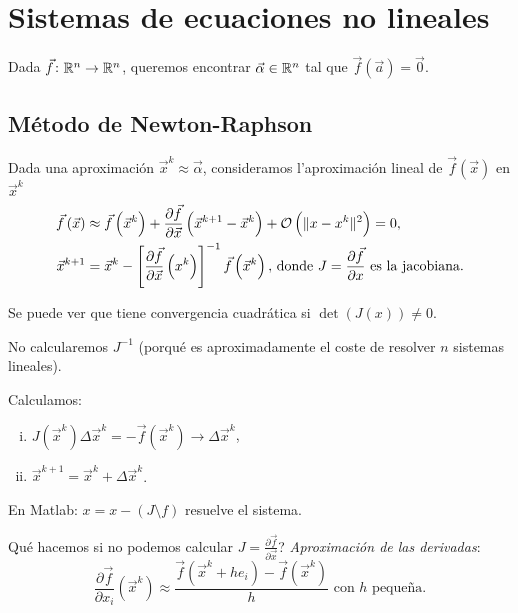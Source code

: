 \chapter{Sistemas de ecuaciones no lineales}

Dada $\vec{f} \colon \mathbb{R}^n \to \mathbb{R}^n$, queremos encontrar $\vec{\alpha} \in \mathbb{R}^n$ tal que $\vec{f}\left( \vec{a} \right) = \vec{0}$.

\section{M\'etodo de Newton-Raphson}

Dada una aproximaci\'on $\vec{x}^k \approx \vec{\alpha}$, consideramos l'aproximaci\'on lineal de $\vec{f}\left( \vec{x} \right)$ en $\vec{x}^k$
\begin{align*}
    \vec{f}\left( \vec{x} \right) &\approx \vec{f}\left( \vec{x}^k \right) + \frac{\partial \vec{f}}{\partial \vec{x}}\left( \vec{x}^{k+1}-\vec{x}^k \right) + \mathcal{O} \left( \|x-x^k\|^2 \right) = 0, \\
    \vec{x}^{k+1} &= \vec{x}^k - \left[ \frac{\partial\vec{f}}{\partial\vec{x}}\left( x^k \right) \right]^{-1} \vec{f}\left( \vec{x}^k \right),\, \text{donde } J = \frac{\partial\vec{f}}{\partial x} \text{ es la jacobiana.}
\end{align*}

Se puede ver que tiene convergencia cuadr\'atica si $\det\left( J(x) \right) \neq 0$.

\begin{obs}
    No calcularemos $J^{-1}$ (porqu\'e es aproximadamente el coste de resolver $n$ sistemas lineales).
\end{obs}

\noindent Calculamos:
\begin{enumerate}[i)]
    \item $J\left( \vec{x}^k \right)\Delta \vec{x}^k = -\vec{f}\left( \vec{x}^k \right) \longrightarrow \Delta \vec{x}^k$,
    \item $\vec{x}^{k+1} = \vec{x}^k + \Delta\vec{x}^k$.
\end{enumerate}
En Matlab: $x = x-(J\setminus f)$ resuelve el sistema.

\noindent Qu\'e hacemos si no podemos calcular $J = \frac{\partial \vec{f}}{\partial \vec{x}}$?
\emph{Aproximaci\'on de las derivadas}:
\[
    \frac{\partial \vec{f}}{\partial x_i}\left( \vec{x}^k \right) \approx \frac{\vec{f}\left( \vec{x}^k + he_i \right) - \vec{f}\left( \vec{x}^k \right)}{h} \text{ con } h \text{ pequeña.}
\]

